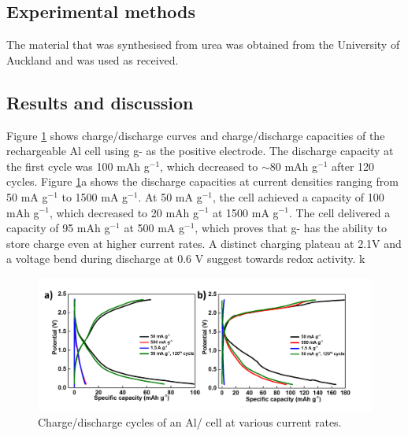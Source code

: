 \subsection{Experimental methods}
The material that was synthesised from urea was obtained from the University of Auckland and was used as received. 

\subsection{Results and discussion}
Figure \ref{Figures/chap6fig:C3N4cdc} shows charge/discharge curves and charge/discharge capacities of the rechargeable Al cell using g- as the positive electrode. The discharge capacity at the first cycle was 100 mAh g$^{-1}$, which decreased to $\sim$80 mAh g$^{-1}$ after 120 cycles. Figure \ref{Figures/chap6fig:C3N4cdc}a shows the discharge capacities at current densities ranging from 50 mA g$^{-1}$ to 1500 mA g$^{-1}$. At 50 mA g$^{-1}$, the cell achieved a capacity of 100 mAh g$^{-1}$, which decreased to 20 mAh g$^{-1}$ at 1500 mA g$^{-1}$. The cell delivered a capacity of 95 mAh g$^{-1}$ at 500 mA g$^{-1}$, which proves that g- has the ability to store charge even at higher current rates. A distinct charging plateau at 2.1V and a voltage bend during discharge at 0.6 V suggest towards redox activity. k

\begin{figure}[th!]
\centering
\includegraphics[width=\textwidth]{Figures/chap6fig/C3N4cdc}
\caption{Charge/discharge cycles of an Al/ cell at various current rates.}
\label{Figures/chap6fig:C3N4cdc}
\end{figure}

